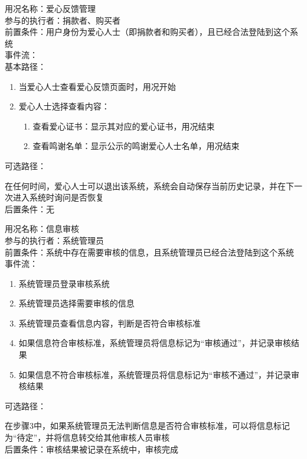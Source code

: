 \begin{framed}
\noindent
用况名称：爱心反馈管理\\
参与的执行者：捐款者、购买者\\
前置条件：用户身份为爱心人士（即捐款者和购买者），且已经合法登陆到这个系统\\
事件流：\\
基本路径：
\begin{enumerate}[itemsep=2pt,topsep=0pt,parsep=0pt,itemindent=1em]
    \item 当爱心人士查看爱心反馈页面时，用况开始
    \item 爱心人士选择查看内容：
    \begin{enumerate}[itemsep=2pt,topsep=0pt,parsep=0pt,itemindent=1em]
          \item 查看爱心证书：显示其对应的爱心证书，用况结束
          \item 查看鸣谢名单：显示公示的鸣谢爱心人士名单，用况结束
      \end{enumerate}
\end{enumerate}
\noindent
可选路径：\par
    在任何时间，爱心人士可以退出该系统，系统会自动保存当前历史记录，并在下一次进入系统时询问是否恢复\\
后置条件：无

\end{framed}

\begin{framed}
\noindent
用况名称：信息审核\\
参与的执行者：系统管理员\\
前置条件：系统中存在需要审核的信息，且系统管理员已经合法登陆到这个系统
事件流： \begin{enumerate}[itemsep=2pt,topsep=0pt,parsep=0pt,itemindent=1em] \item 系统管理员登录审核系统 \item 系统管理员选择需要审核的信息 \item 系统管理员查看信息内容，判断是否符合审核标准 \item 如果信息符合审核标准，系统管理员将信息标记为“审核通过”，并记录审核结果 \item 如果信息不符合审核标准，系统管理员将信息标记为“审核不通过”，并记录审核结果 \end{enumerate}
\noindent
可选路径： \par
在步骤3中，如果系统管理员无法判断信息是否符合审核标准，可以将信息标记为“待定”，并将信息转交给其他审核人员审核\\
后置条件：审核结果被记录在系统中，审核完成

\end{framed}